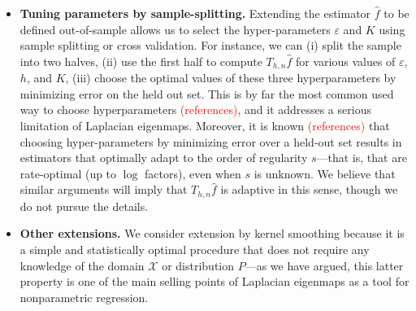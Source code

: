 \documentclass{article}
\newcommand{\1}{\mathbf{1}}
\newcommand{\mc}[1]{\mathcal{#1}}
\newcommand{\wh}[1]{\widehat{#1}}
\theoremstyle{alden}
\theoremstyle{aldenthm}
\theoremstyle{definition}
\theoremstyle{remark}
\begin{document}
\begin{itemize}
	\item \textbf{Tuning parameters by sample-splitting.} Extending the estimator $\wh{f}$ to be defined out-of-sample allows us to select the hyper-parameters $\varepsilon$ and $K$ using sample splitting or cross validation. For instance, we can (i) split the sample into two halves, (ii) use the first half to compute $T_{h,n}\wh{f}$ for various values of $\varepsilon$, $h$, and $K$, (iii) choose the optimal values of these three hyperparameters by minimizing error on the held out set. This is by far the most common used way to choose hyperparameters \textcolor{red}{(references)}, and it addresses a serious limitation of Laplacian eigenmaps. Moreover, it is known \textcolor{red}{(references)} that choosing hyper-parameters by minimizing error over a held-out set results in estimators that optimally adapt to the order of regularity $s$---that is, that are rate-optimal (up to $\log$ factors), even when $s$ is unknown. We believe that similar arguments will imply that $T_{h,n}\wh{f}$ is adaptive in this sense, though we do not pursue the details.
	\item \textbf{Other extensions.} We consider extension by kernel smoothing because it is a simple and statistically optimal procedure that does not require any knowledge of the domain $\mc{X}$ or distribution $P$---as we have argued, this latter property is one of the main selling points of Laplacian eigenmaps as a tool for nonparametric regression. 
	

\end{itemize}
\end{document}
